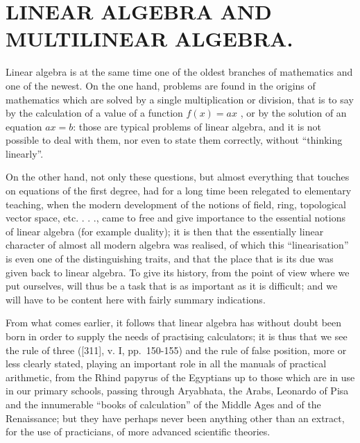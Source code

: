 \chapter{LINEAR ALGEBRA AND MULTILINEAR ALGEBRA.}

Linear algebra is at the same time one of the oldest branches of mathematics and one of the newest. On the one hand, problems are found in the origins of mathematics which are solved by a single multiplication or division, that is to say by the calculation of a value of a function \(f(x) = ax\) , or by the solution of an equation \(ax = b\): those are typical problems of linear algebra, and it is not possible to deal with them, nor even to state them correctly, without ``thinking linearly''.

On the other hand, not only these questions, but almost everything that touches on equations of the first degree, had for a long time been relegated to elementary teaching, when the modern development of the notions of field, ring, topological vector space, etc. . . ., came to free and give importance to the essential notions of linear algebra (for example duality); it is then that the essentially linear character of almost all modern algebra was realised, of which this ``linearisation'' is even one of the distinguishing traits, and that the place that is its due was given back to linear algebra. To give its history, from the point of view where we put ourselves, will thus be a task that is as important as it is difficult; and we will have to be content here with fairly summary indications.

From what comes earlier, it follows that linear algebra has without doubt been born in order to supply the needs of practising calculators; it is thus that we see the rule of three ({[}311{]}, v. I, pp.~150-155) and the rule of false position, more or less clearly stated, playing an important role in all the manuals of practical arithmetic, from the Rhind papyrus of the Egyptians up to those which are in use in our primary schools, passing through Aryabhata, the Arabs, Leonardo of Pisa and the innumerable ``books of calculation'' of the Middle Ages and of the Renaissance; but they have perhaps never been anything other than an extract, for the use of practicians, of more advanced scientific theories.

